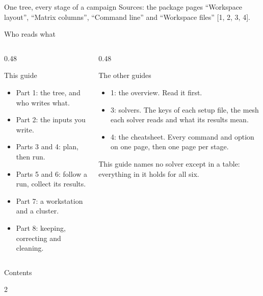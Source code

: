 \documentclass[aspectratio=169,11pt]{beamer}
\begin{document}
  {One tree, every stage of a campaign}
  {Sources: the package pages ``Workspace layout'', ``Matrix columns'',
   ``Command line'' and ``Workspace files'' [1, 2, 3, 4].}

\begin{frame}{Who reads what}
\begin{columns}[T]
\begin{column}{0.48\textwidth}
\begin{block}{This guide}
\begin{itemize}\small
  \item Part 1: the tree, and who writes what.
  \item Part 2: the inputs you write.
  \item Parts 3 and 4: plan, then run.
  \item Parts 5 and 6: follow a run, collect its results.
  \item Part 7: a workstation and a cluster.
  \item Part 8: keeping, correcting and cleaning.
\end{itemize}
\end{block}
\end{column}
\begin{column}{0.48\textwidth}
\begin{block}{The other guides}
\begin{itemize}\small
  \item 1: the overview. Read it first.
  \item 3: solvers. The keys of each setup file, the mesh each solver reads
        and what its results mean.
  \item 4: the cheatsheet. Every command and option on one page, then one
        page per stage.
\end{itemize}
\end{block}
This guide names no solver except in a table: everything in it holds for all
six.
\end{column}
\end{columns}
\end{frame}

\begin{frame}{Contents}
\begin{multicols}{2}
\tableofcontents
\end{multicols}
\end{frame}





\end{document}
